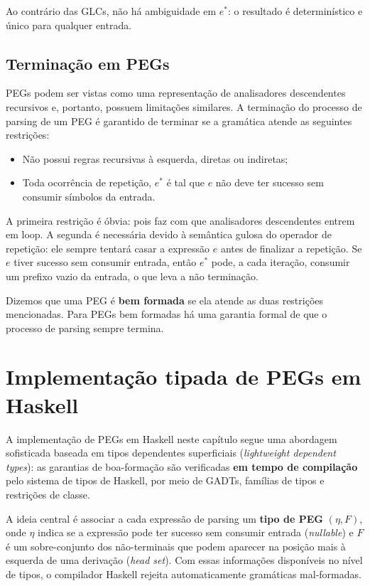 Ao contrário das GLCs, não há ambiguidade em \(e^*\): o resultado é
determinístico e único para qualquer entrada.

\subsection{Terminação em PEGs}

PEGs podem ser vistas como uma representação de analisadores
descendentes recursivos e, portanto, possuem limitações similares. A
terminação do processo de parsing de um PEG é garantido de terminar
se a gramática atende as seguintes restrições:

\begin{itemize}
  \item
    Não possui regras recursivas à esquerda, diretas ou indiretas;
  \item
    Toda ocorrência de repetição, \(e^*\) é tal que \(e\) não deve
    ter sucesso sem consumir símbolos da entrada.
\end{itemize}

A primeira restrição é óbvia: pois faz com que analisadores
descendentes entrem em loop. A segunda é necessária devido à
semântica gulosa do operador de repetição: ele sempre tentará casar a
expressão \(e\) antes de finalizar a repetição. Se \(e\) tiver
sucesso sem consumir entrada, então \(e^*\) pode, a cada iteração,
consumir um prefixo vazio da entrada, o que leva a não terminação.

Dizemos que uma PEG é \textbf{bem formada} se ela atende as duas
restrições mencionadas. Para PEGs bem formadas há uma garantia formal
de que o processo de parsing sempre termina.

\section{Implementação tipada de PEGs em Haskell}

A implementação de PEGs em Haskell neste capítulo segue uma abordagem
sofisticada baseada em tipos dependentes superficiais (\emph{lightweight
dependent types}): as garantias de boa-formação são verificadas
\textbf{em tempo de compilação} pelo sistema de tipos de Haskell, por
meio de GADTs, famílias de tipos e restrições de classe.

A ideia central é associar a cada expressão de parsing um
\textbf{tipo de PEG} \((\eta, F)\), onde \(\eta\) indica se a expressão pode
ter sucesso sem consumir entrada (\emph{nullable}) e \(F\) é um
sobre-conjunto dos não-terminais que podem aparecer na posição
mais à esquerda de uma derivação (\emph{head set}). Com essas
informações disponíveis no nível de tipos, o compilador Haskell rejeita
automaticamente gramáticas mal-formadas.

